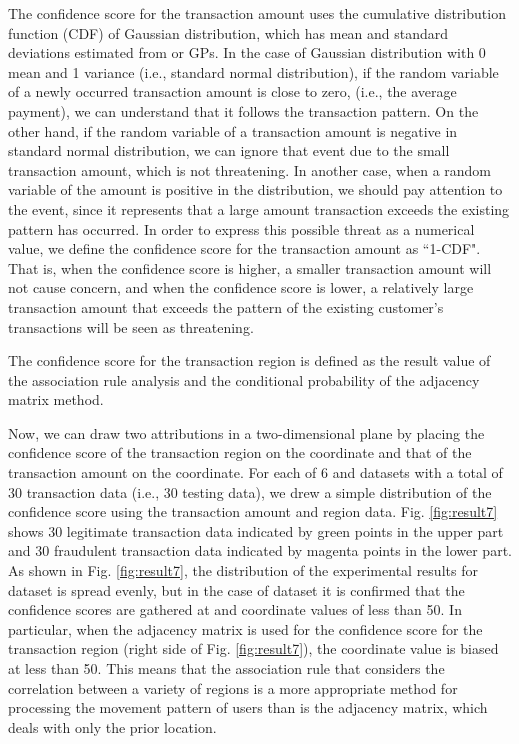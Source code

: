 \documentclass[final,authoryear,5p,times,twocolumn]{elsarticle}
\begin{document}
The confidence score for the transaction amount uses the cumulative distribution function (CDF) of Gaussian distribution, which has mean and standard deviations estimated from  or GPs. In the case of Gaussian distribution with 0 mean and 1 variance (i.e., standard normal distribution), if the random variable of a newly occurred transaction amount is close to zero, (i.e., the average payment), we can understand that it follows the transaction pattern. On the other hand, if the random variable of a transaction amount is negative in standard normal distribution, we can ignore that event due to the small transaction amount, which is not threatening. In another case, when a random variable of the amount is positive in the distribution, we should pay attention to the event, since it represents that a large amount transaction exceeds the existing pattern has occurred. In order to express this possible threat as a numerical value, we define the confidence score for the transaction amount as ``1-CDF". That is, when the confidence score is higher, a smaller transaction amount will not cause concern, and when the confidence score is lower, a relatively large transaction amount that exceeds the pattern of the existing customer's transactions will be seen as threatening.

The confidence score for the transaction region is defined as the result value of the association rule analysis and the conditional probability of the adjacency matrix method.

Now, we can draw two attributions in a two-dimensional plane by placing the confidence score of the transaction region on the  coordinate and that of the transaction amount on the  coordinate. For each of 6  and  datasets with a total of 30 transaction data (i.e., 30 testing data), we drew a simple distribution of the confidence score using the transaction amount and region data. Fig. \ref{fig:result7} shows 30 legitimate transaction data indicated by green points in the upper part and 30 fraudulent transaction data indicated by magenta points in the lower part. As shown in Fig. \ref{fig:result7}, the distribution of the experimental results for dataset  is spread evenly, but in the case of dataset  it is confirmed that the confidence scores are gathered at  and  coordinate values of less than 50. In particular, when the adjacency matrix is used for the confidence score for the transaction region (right side of Fig. \ref{fig:result7}), the  coordinate value is biased at less than 50. This means that the association rule that considers the correlation between a variety of regions is a more appropriate method for processing the movement pattern of users than is the adjacency matrix, which deals with only the prior location.
\end{document}
